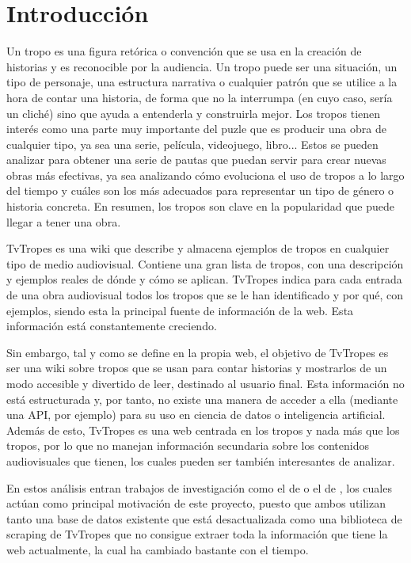 \chapter{Introducción}

Un tropo es una figura retórica o convención que se usa en la creación de historias y es reconocible por la audiencia. Un tropo puede ser una situación, un tipo de personaje, una estructura narrativa o cualquier patrón que se utilice a la hora de contar una historia, de forma que no la interrumpa (en cuyo caso, sería un cliché) sino que ayuda a entenderla y construirla mejor. Los tropos tienen interés como una parte muy importante del puzle que es producir una obra de cualquier tipo, ya sea una serie, película, videojuego, libro... Estos se pueden analizar para obtener una serie de pautas que puedan servir para crear nuevas obras más efectivas, ya sea analizando cómo evoluciona el uso de tropos a lo largo del tiempo y cuáles son los más adecuados para representar un tipo de género o historia concreta. En resumen, los tropos son clave en la popularidad que puede llegar a tener una obra. 

TvTropes \cite{tvtropes} es una wiki que describe y almacena ejemplos de tropos en cualquier tipo de medio audiovisual. Contiene una gran lista de tropos, con una descripción y ejemplos reales de dónde y cómo se aplican. TvTropes indica para cada entrada de una obra audiovisual todos los tropos que se le han identificado y por qué, con ejemplos, siendo esta la principal fuente de información de la web. Esta información está constantemente creciendo.

Sin embargo, tal y como se define en la propia web, el objetivo de TvTropes es ser una wiki sobre tropos que se usan para contar historias y mostrarlos de un modo accesible y divertido de leer, destinado al usuario final. Esta información no está estructurada y, por tanto, no existe una manera de acceder a ella (mediante una API, por ejemplo) para su uso en ciencia de datos o inteligencia artificial. Además de esto, TvTropes es una web centrada en los tropos y nada más que los tropos, por lo que no manejan información secundaria sobre los contenidos audiovisuales que tienen, los cuales pueden ser también interesantes de analizar.

En estos análisis entran trabajos de investigación como el de \cite{garcia2020tropes} o el de \cite{tfgantoniogamiz}, los cuales actúan como principal motivación de este proyecto, puesto que ambos utilizan tanto una base de datos existente que está desactualizada como una biblioteca de scraping de TvTropes que no consigue extraer toda la información que tiene la web actualmente, la cual ha cambiado bastante con el tiempo.

